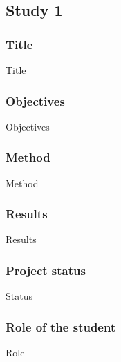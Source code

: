 \subsection*{Study 1}

\subsubsection*{Title}
Title

\subsubsection*{Objectives}
Objectives

\subsubsection*{Method}
Method

\subsubsection*{Results}
Results

\subsubsection*{Project status}
Status

\subsubsection*{Role of the student}
Role

